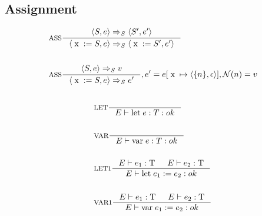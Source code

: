 \subsection{Assignment}\label{subsec:assignment}
\begin{align*}
&\inference[ASS]{\Braket{S,e} \Rightarrow_S \Braket{S',e'}}
                 {\Braket{\Tx := S,e} \Rightarrow_S \Braket{\Tx := S',e'}}
\\\\
&\inference[ASS]{\Braket{S,e} \Rightarrow_S v}
                 {\Braket{\Tx := S,e} \Rightarrow_S e'}
								 {, e' = e[\Tx \mapsto \Braket{\{n\},\epsilon}], \mathcal{N}(n) = v}
\end{align*}


\begin{align*}
\intertext{}
&\inference[LET]{}
                 {\Tenv \mathbin{\text{let}} \; e:T: ok}
\\\\
&\inference[VAR]{}
                 {\Tenv \mathbin{\text{var}} \; e:T: ok}
\\\\
&\inference[LET1]{\Tenv e_1: \Tt & \Tenv e_2: \Tt}
                 {\Tenv \mathbin{\text{let}} \; e_1 := e_2: ok}
\\\\
&\inference[VAR1]{\Tenv e_1: \Tt & \Tenv e_2: \Tt}
                 {\Tenv \mathbin{\text{var}} \; e_1 := e_2: ok}
\end{align*}
